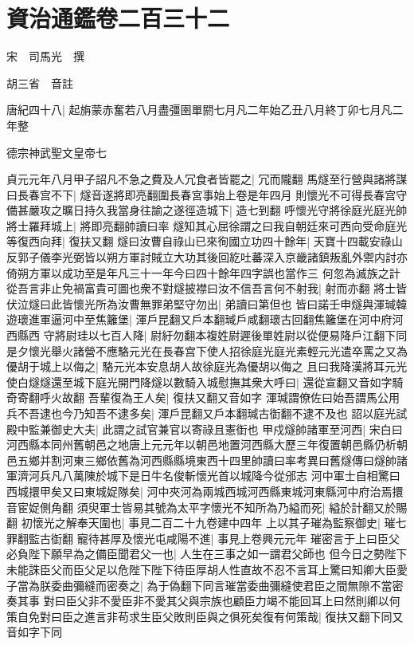 \chapter{資治通鑑卷二百三十二}
宋　司馬光　撰

胡三省　音註

唐紀四十八|{
	起旃蒙赤奮若八月盡彊圉單閼七月凡二年始乙丑八月終丁卯七月凡二年整}


德宗神武聖文皇帝七

貞元元年八月甲子詔凡不急之費及人冗食者皆罷之|{
	冗而隴翻}
馬燧至行營與諸將謀曰長春宫不下|{
	燧音遂將即亮翻圍長春宮事始上卷是年四月}
則懷光不可得長春宫守備甚嚴攻之曠日持久我當身往諭之遂徑造城下|{
	造七到翻}
呼懷光守將徐庭光庭光帥將士羅拜城上|{
	將即亮翻帥讀曰率}
燧知其心屈徐謂之曰我自朝廷來可西向受命庭光等復西向拜|{
	復扶又翻}
燧曰汝曹自祿山已來徇國立功四十餘年|{
	天寶十四載安祿山反郭子儀李光弼皆以朔方軍討賊立大功其後回紇吐蕃深入京畿諸鎮叛亂外禦内討亦倚朔方軍以成功至是年凡三十一年今曰四十餘年四字誤也當作三}
何忽為滅族之計從吾言非止免禍富貴可圖也衆不對燧披襟曰汝不信吾言何不射我|{
	射而亦翻}
將士皆伏泣燧曰此皆懷光所為汝曹無罪弟堅守勿出|{
	弟讀曰第但也}
皆曰諾壬申燧與渾瑊韓遊瓌進軍逼河中至焦籬堡|{
	渾戶昆翻又戶本翻瑊戶咸翻瓌古回翻焦籬堡在河中府河西縣西}
守將尉珪以七百人降|{
	尉紆勿翻本複姓尉遲後單姓尉以從便易降戶江翻下同}
是夕懷光舉火諸營不應駱元光在長春宫下使人招徐庭光庭光素輕元光遣卒罵之又為優胡于城上以侮之|{
	駱元光本安息胡人故徐庭光為優胡以侮之}
且曰我降漢將耳元光使白燧燧還至城下庭光開門降燧以數騎入城慰撫其衆大呼曰|{
	還從宣翻又音如字騎奇寄翻呼火故翻}
吾輩復為王人矣|{
	復扶又翻又音如字}
渾瑊謂僚佐曰始吾謂馬公用兵不吾逮也今乃知吾不逮多矣|{
	渾戶昆翻又戶本翻瑊古衘翻不逮不及也}
詔以庭光試殿中監兼御史大夫|{
	此謂之試官兼官以寄祿且憲衘也}
甲戍燧帥諸軍至河西|{
	宋白曰河西縣本同州舊朝邑之地唐上元元年以朝邑地置河西縣大歷三年復置朝邑縣仍析朝邑五鄉并割河東三鄉依舊為河西縣縣境東西十四里帥讀曰率考異曰舊燧傳曰燧帥諸軍濟河兵凡八萬陳於城下是日牛名俊斬懷光首以城降今從邠志}
河中軍士自相驚曰西城擐甲矣又曰東城娖隊矣|{
	河中夾河為兩城西城河西縣東城河東縣河中府治焉擐音宦娖側角翻}
須臾軍士皆易其號為太平字懷光不知所為乃縊而死|{
	縊於計翻又於賜翻}
初懷光之解奉天圍也|{
	事見二百二十九卷建中四年}
上以其子璀為監察御史|{
	璀七罪翻監古衘翻}
寵待甚厚及懷光屯咸陽不進|{
	事見上卷興元元年}
璀密言于上曰臣父必負陛下願早為之備臣聞君父一也|{
	人生在三事之如一謂君父師也}
但今日之勢陛下未能誅臣父而臣父足以危陛下陛下待臣厚胡人性直故不忍不言耳上驚曰知卿大臣愛子當為朕委曲彌縫而密奏之|{
	為于偽翻下同言璀當委曲彌縫使君臣之間無隙不當密奏其事}
對曰臣父非不愛臣非不愛其父與宗族也顧臣力竭不能回耳上曰然則卿以何策自免對曰臣之進言非苟求生臣父敗則臣與之俱死矣復有何策哉|{
	復扶又翻下同又音如字下同}
